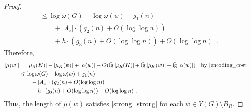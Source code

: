 \documentclass{patmorin}
\let\eqref\cref
\renewcommand{\le}{\leqslant}
\DeclareMathOperator{\lgg}{\hat{lg}}
\newcommand{\Oh}{O}
\begin{document}
\begin{proof}
\begin{align*}
     & \le \log \omega(G) - \log\omega(w) + g_1(n)                              \\
     & \qquad {} + |A_z|\cdot (g_2(n)+\Oh(\log\log n))                          \\
     & \qquad {} + h\cdot (g_3(n) + \Oh(\log\log n)) + \Oh(\log\log n)\enspace.
  \end{align*}
  Therefore,
  \begin{align*}
    |\mu(w)|
     & =|\mu_R(K)|+|\mu_K(w)|+|\alpha(w)|+ \Oh(\lgg|\mu_R(K)|+\lgg|\mu_K(w)|+\lgg|\alpha(w)|)
     & \text{by \eqref{encoding_cost}}                                                        \\
     & \le \log \omega(G) - \log\omega(w) + g_1(n)                                            \\
     & \qquad {} + |A_z|\cdot (g_2(n)+\Oh(\log\log n))                                        \\
     & \qquad {} + h\cdot (g_3(n) + \Oh(\log\log n)) + \Oh(\log\log n)\enspace.
  \end{align*}
  Thus, the length of $\mu(w)$ satisfies \eqref{strong_strong} for each $w\in V(G)\setminus B_R$.


\end{proof}
\end{document}
